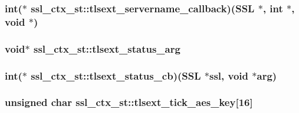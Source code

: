 \hypertarget{structssl__ctx__st_aab0b46fe325bc9d023fc3eec4c29adf3}{
\subsubsection[{tlsext\-\_\-servername\-\_\-callback}]{\setlength{\rightskip}{0pt plus 5cm}int($\ast$ ssl\-\_\-ctx\-\_\-st\-::tlsext\-\_\-servername\-\_\-callback)(S\-S\-L $\ast$, int $\ast$, void $\ast$)}}\label{structssl__ctx__st_aab0b46fe325bc9d023fc3eec4c29adf3}
\hypertarget{structssl__ctx__st_a34c025b8e62d9ade63d51808d9271192}{
\subsubsection[{tlsext\-\_\-status\-\_\-arg}]{\setlength{\rightskip}{0pt plus 5cm}void$\ast$ ssl\-\_\-ctx\-\_\-st\-::tlsext\-\_\-status\-\_\-arg}}\label{structssl__ctx__st_a34c025b8e62d9ade63d51808d9271192}
\hypertarget{structssl__ctx__st_aa4c9b99b51d363cafc0d6f22c34d64eb}{
\subsubsection[{tlsext\-\_\-status\-\_\-cb}]{\setlength{\rightskip}{0pt plus 5cm}int($\ast$ ssl\-\_\-ctx\-\_\-st\-::tlsext\-\_\-status\-\_\-cb)(S\-S\-L $\ast$ssl, void $\ast$arg)}}\label{structssl__ctx__st_aa4c9b99b51d363cafc0d6f22c34d64eb}
\hypertarget{structssl__ctx__st_ad6776ce4d46e74ca3580f34365c53b41}{
\subsubsection[{tlsext\-\_\-tick\-\_\-aes\-\_\-key}]{\setlength{\rightskip}{0pt plus 5cm}unsigned char ssl\-\_\-ctx\-\_\-st\-::tlsext\-\_\-tick\-\_\-aes\-\_\-key\mbox{[}16\mbox{]}}}\label{structssl__ctx__st_ad6776ce4d46e74ca3580f34365c53b41}
